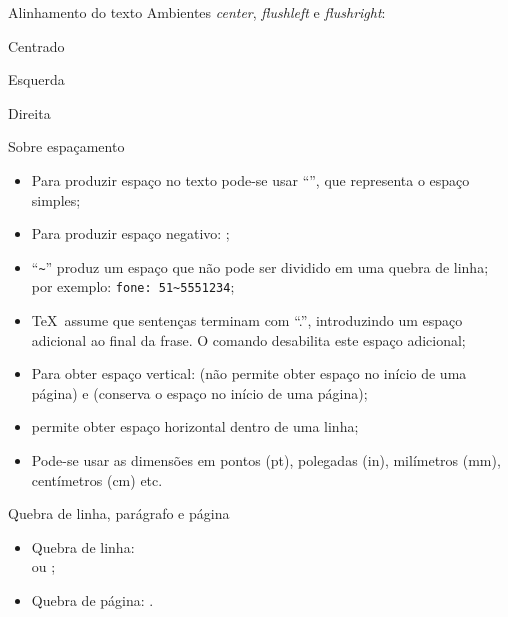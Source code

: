 \begin{frame}{Alinhamento do texto}
Ambientes \emph{center}, \emph{flushleft} e \emph{flushright}:

\begin{center}
\Huge Centrado
\end{center}

\begin{flushleft}
\Huge Esquerda
\end{flushleft}

\begin{flushright}
\Huge Direita
\end{flushright}
\end{frame}

\begin{frame}{Sobre espaçamento}\fontsize{10}{12}\selectfont
\begin{itemize}
\item Para produzir espaço no texto pode-se usar ``\LCmd{\textvisiblespace}'', que representa o espaço simples;
\item Para produzir espaço negativo: \texttt{\string\!};
\item ``\texttt{\textasciitilde}'' produz um espaço que não pode ser dividido em uma quebra de linha; por exemplo: \texttt{fone:\ 51\textasciitilde5551234};
\item \TeX\ assume que sentenças terminam com ``.'', introduzindo um espaço adicional ao final da frase. O comando  desabilita este espaço adicional;
\item Para obter espaço vertical:  (não permite obter espaço no início de uma página) e  (conserva o espaço no início de uma página);
\item {} permite obter espaço horizontal dentro de uma linha;
\item Pode-se usar as dimensões em pontos (pt), polegadas (in), milímetros (mm), centímetros (cm) etc.
\end{itemize}
\end{frame}

\begin{frame}{Quebra de linha, parágrafo e página}


\begin{itemize}
\item Quebra de linha: \texttt{\string\\ } ou \texttt{\string\newline};
\item Quebra de página: \texttt{\string\newpage}.
\end{itemize}

\end{frame}

